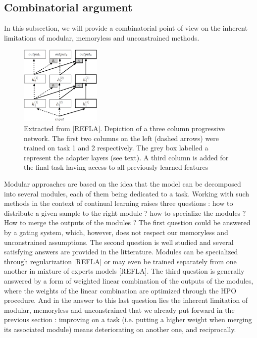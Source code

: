 \documentclass[11pt]{article}
\begin{document}
\subsection{Combinatorial argument}


In this subsection, we will provide a combinatorial point of view on the inherent limitations of modular, memoryless and unconstrained methods.

\begin{figure}
    \centering
    \includegraphics[width=0.35\textwidth]{images/PNN.png}
    \caption{Extracted from [REFLA]. Depiction of a three column progressive network. The first two columns on the left (dashed arrows) were trained on task 1 and 2 respectively. The grey box labelled a represent the adapter layers (see text). A third column is added for the final task having access to all previously learned features}
    \label{fig:PNN}
\end{figure}

\vspace{2mm}
\noindent
Modular approaches are based on the idea that the model can be decomposed into several modules, each of them being dedicated to a task. Working with such methods in the context of continual learning raises three questions : how to distribute a given sample to the right module ? how to specialize the modules ? How to merge the outputs of the modules ? The first question could be answered by a gating system, which, however, does not respect our memoryless and unconstrained assumptions. The second question is well studied and several satisfying answers are provided in the litterature. Modules can be specialized through regularization [REFLA] or may even be trained separately from one another in mixture of experts models [REFLA]. The third question is generally answered by a form of weighted linear combination of the outputs of the modules, where the weights of the linear combination are optimized through the HPO procedure. And in the answer to this last question lies the inherent limitation of modular, memoryless and unconstrained that we already put forward in the previous section : improving on a task (i.e. putting a higher weight when merging its associated module) means deteriorating on another one, and reciprocally. 
\end{document}
